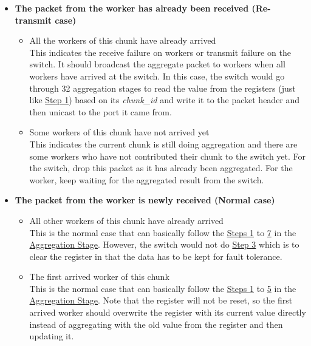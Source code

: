 \documentclass[a4paper,11pt]{article}
\begin{document}
\begin{itemize}
    \item \textbf{The packet from the worker has already been received (Re-transmit case)}
    \begin{itemize}
        \item All the workers of this chunk have already arrived \\
        This indicates the receive failure on workers or transmit failure on the switch. It should broadcast the aggregate packet to workers when all workers have arrived at the switch. In this case, the switch would go through 32 aggregation stages to read the value from the registers (just like \hyperref[aggstep1]{Step 1}) based on its \textit{chunk\_id} and write it to the packet header and then unicast to the port it came from.
        \item Some workers of this chunk have not arrived yet \\
        This indicates the current chunk is still doing aggregation and there are some workers who have not contributed their chunk to the switch yet. For the switch, drop this packet as it has already been aggregated. For the worker, keep waiting for the aggregated result from the switch.
    \end{itemize}
    \item \textbf{The packet from the worker is newly received (Normal case)}
    \begin{itemize}
        \item All other workers of this chunk have already arrived \\
        This is the normal case that can basically follow the \hyperref[aggstepl1]{Steps 1} to \hyperref[aggstepl7]{7} in the \hyperref[aggstg]{Aggregation Stage}. However, the switch would not do \hyperref[aggstepl1]{Step 3} which is to clear the register in that the data has to be kept for fault tolerance.
        \item The first arrived worker of this chunk \\
        This is the normal case that can basically follow the \hyperref[aggstep1]{Steps 1} to \hyperref[aggstep5]{5} in the \hyperref[aggstg]{Aggregation Stage}. Note that the register will not be reset, so the first arrived worker should overwrite the register with its current value directly instead of aggregating with the old value from the register and then updating it.
    \end{itemize}
\end{itemize}
\end{document}
